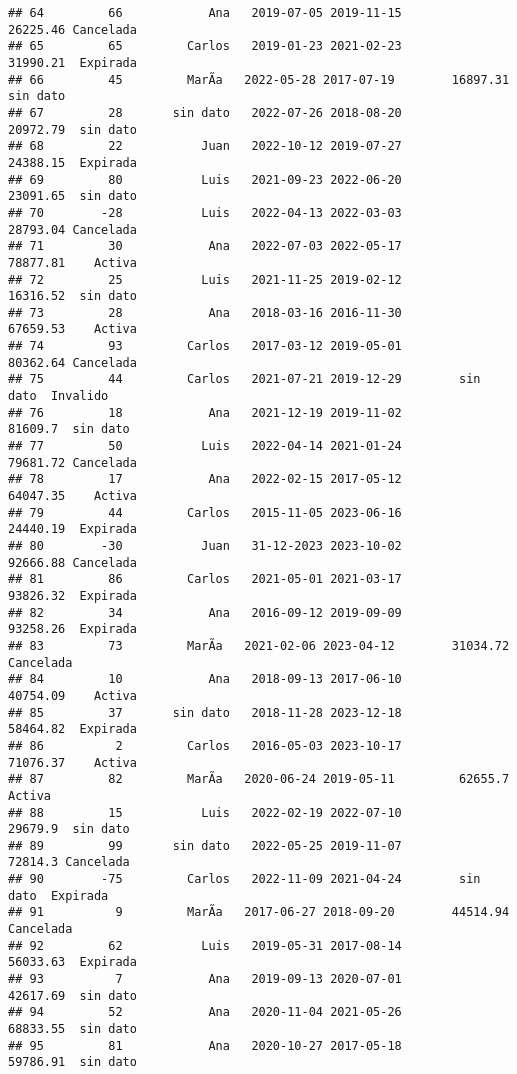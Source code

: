 \documentclass[
]{article}
\begin{document}
\begin{verbatim}
## 64         66            Ana   2019-07-05 2019-11-15        26225.46 Cancelada
## 65         65         Carlos   2019-01-23 2021-02-23        31990.21  Expirada
## 66         45         MarÃ­a   2022-05-28 2017-07-19        16897.31  sin dato
## 67         28       sin dato   2022-07-26 2018-08-20        20972.79  sin dato
## 68         22           Juan   2022-10-12 2019-07-27        24388.15  Expirada
## 69         80           Luis   2021-09-23 2022-06-20        23091.65  sin dato
## 70        -28           Luis   2022-04-13 2022-03-03        28793.04 Cancelada
## 71         30            Ana   2022-07-03 2022-05-17        78877.81    Activa
## 72         25           Luis   2021-11-25 2019-02-12        16316.52  sin dato
## 73         28            Ana   2018-03-16 2016-11-30        67659.53    Activa
## 74         93         Carlos   2017-03-12 2019-05-01        80362.64 Cancelada
## 75         44         Carlos   2021-07-21 2019-12-29        sin dato  Invalido
## 76         18            Ana   2021-12-19 2019-11-02         81609.7  sin dato
## 77         50           Luis   2022-04-14 2021-01-24        79681.72 Cancelada
## 78         17            Ana   2022-02-15 2017-05-12        64047.35    Activa
## 79         44         Carlos   2015-11-05 2023-06-16        24440.19  Expirada
## 80        -30           Juan   31-12-2023 2023-10-02        92666.88 Cancelada
## 81         86         Carlos   2021-05-01 2021-03-17        93826.32  Expirada
## 82         34            Ana   2016-09-12 2019-09-09        93258.26  Expirada
## 83         73         MarÃ­a   2021-02-06 2023-04-12        31034.72 Cancelada
## 84         10            Ana   2018-09-13 2017-06-10        40754.09    Activa
## 85         37       sin dato   2018-11-28 2023-12-18        58464.82  Expirada
## 86          2         Carlos   2016-05-03 2023-10-17        71076.37    Activa
## 87         82         MarÃ­a   2020-06-24 2019-05-11         62655.7    Activa
## 88         15           Luis   2022-02-19 2022-07-10         29679.9  sin dato
## 89         99       sin dato   2022-05-25 2019-11-07         72814.3 Cancelada
## 90        -75         Carlos   2022-11-09 2021-04-24        sin dato  Expirada
## 91          9         MarÃ­a   2017-06-27 2018-09-20        44514.94 Cancelada
## 92         62           Luis   2019-05-31 2017-08-14        56033.63  Expirada
## 93          7            Ana   2019-09-13 2020-07-01        42617.69  sin dato
## 94         52            Ana   2020-11-04 2021-05-26        68833.55  sin dato
## 95         81            Ana   2020-10-27 2017-05-18        59786.91  sin dato

\end{verbatim}
\end{document}

